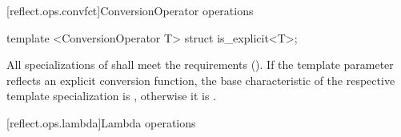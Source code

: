 [reflect.ops.convfct]{ConversionOperator operations}
\begin{std.txt}\color{addclr}
\begin{itemdecl}
template <ConversionOperator T> struct is_explicit<T>;
\end{itemdecl}
\begin{itemdescr}
\pnum
      All specializations of  shall meet the
       requirements (). If the template
      parameter reflects an explicit conversion function, the base
      characteristic of the respective template specialization is
      , otherwise it is .
\end{itemdescr}
\end{std.txt}


[reflect.ops.lambda]{Lambda operations}
